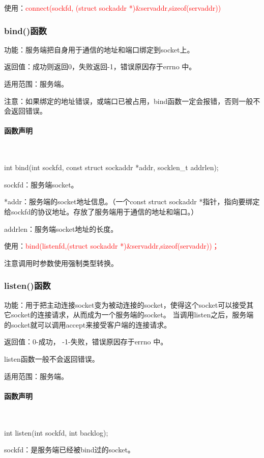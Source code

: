 \documentclass[UTF8]{article}%
\begin{document}
使用：\textcolor{red}{connect(sockfd, (struct sockaddr *)\&servaddr,sizeof(servaddr))}

\subsubsection{bind()函数}

功能：服务端把自身用于通信的地址和端口绑定到socket上。

返回值：成功则返回0，失败返回-1，错误原因存于errno 中。

适用范围：服务端。

注意：如果绑定的地址错误，或端口已被占用，bind函数一定会报错，否则一般不会返回错误。

\paragraph{函数声明}~{}

int bind(int sockfd, const struct sockaddr *addr, socklen\_t addrlen);

sockfd：服务端socket。

*addr：服务端的socket地址信息。（一个const struct sockaddr *指针，指向要绑定给sockfd的协议地址。存放了服务端用于通信的地址和端口。）

addrlen：服务端socket地址的长度。

使用：\textcolor{red}{bind(listenfd,(struct sockaddr *)\&servaddr,sizeof(servaddr))；}

注意调用时参数使用强制类型转换。

\subsubsection{listen()函数}

功能：用于把主动连接socket变为被动连接的socket，使得这个socket可以接受其它socket的连接请求，从而成为一个服务端的socket。 当调用listen之后，服务端的socket就可以调用accept来接受客户端的连接请求。

返回值：0-成功， -1-失败，错误原因存于errno 中。

listen函数一般不会返回错误。

适用范围：服务端。

\paragraph{函数声明}~{}

int listen(int sockfd, int backlog);

sockfd：是服务端已经被bind过的socket。
\end{document}
